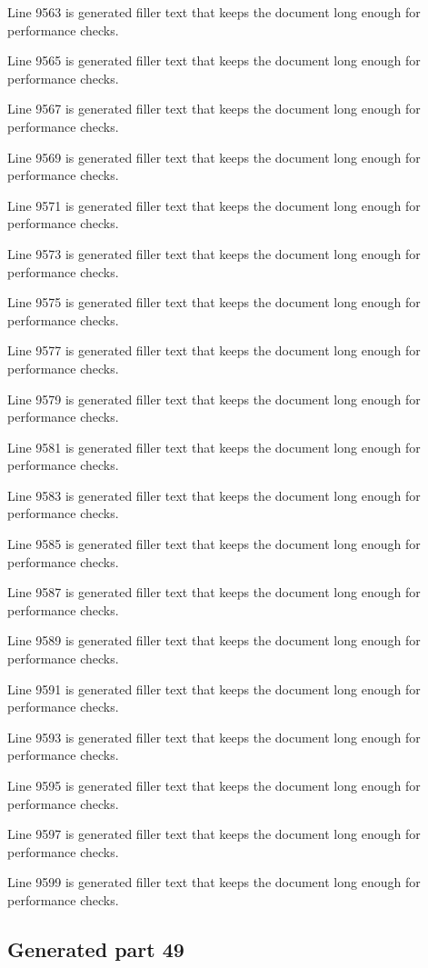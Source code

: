 Line 9563 is generated filler text that keeps the document long enough for performance checks.

Line 9565 is generated filler text that keeps the document long enough for performance checks.

Line 9567 is generated filler text that keeps the document long enough for performance checks.

Line 9569 is generated filler text that keeps the document long enough for performance checks.

Line 9571 is generated filler text that keeps the document long enough for performance checks.

Line 9573 is generated filler text that keeps the document long enough for performance checks.

Line 9575 is generated filler text that keeps the document long enough for performance checks.

Line 9577 is generated filler text that keeps the document long enough for performance checks.

Line 9579 is generated filler text that keeps the document long enough for performance checks.

Line 9581 is generated filler text that keeps the document long enough for performance checks.

Line 9583 is generated filler text that keeps the document long enough for performance checks.

Line 9585 is generated filler text that keeps the document long enough for performance checks.

Line 9587 is generated filler text that keeps the document long enough for performance checks.

Line 9589 is generated filler text that keeps the document long enough for performance checks.

Line 9591 is generated filler text that keeps the document long enough for performance checks.

Line 9593 is generated filler text that keeps the document long enough for performance checks.

Line 9595 is generated filler text that keeps the document long enough for performance checks.

Line 9597 is generated filler text that keeps the document long enough for performance checks.

Line 9599 is generated filler text that keeps the document long enough for performance checks.

\subsection{Generated part 49}

